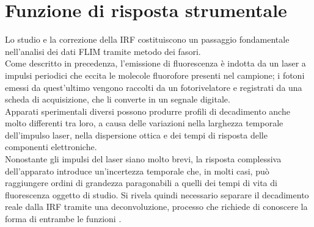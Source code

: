 \section{Funzione di risposta strumentale} %
\label{sec:funzione_di_risposta_dello_strumento}

Lo studio e la correzione della IRF costituiscono un passaggio fondamentale nell'analisi dei dati FLIM tramite metodo dei fasori.\\
Come descritto in precedenza, l'emissione di fluorescenza è indotta da un laser a impulsi periodici che eccita le molecole fluorofore presenti nel campione; i fotoni emessi da quest'ultimo vengono raccolti da un fotorivelatore e registrati da una scheda di acquisizione, che li converte in un segnale digitale.\\
Apparati sperimentali diversi possono produrre profili di decadimento anche molto differenti tra loro, a causa delle variazioni nella larghezza temporale dell'impulso laser, nella dispersione ottica e dei tempi di risposta delle componenti elettroniche.\\
Nonostante gli impulsi del laser siano molto brevi, la risposta complessiva dell'apparato introduce un'incertezza temporale che, in molti casi, può raggiungere ordini di grandezza paragonabili a quelli dei tempi di vita di fluorescenza oggetto di studio. Si rivela quindi necessario separare il decadimento reale dalla IRF tramite una deconvoluzione, processo che richiede di conoscere la forma di entrambe le funzioni \cite{ranjitFitfreeAnalysisFluorescence2018}.

